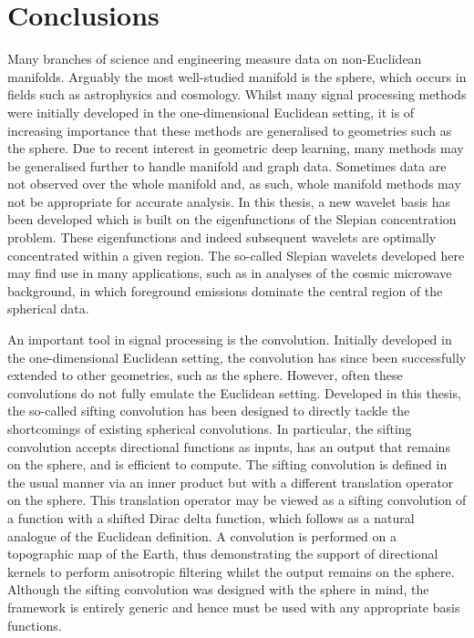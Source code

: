 \chapter{Conclusions}\label{sec:chapter6}

Many branches of science and engineering measure data on non-Euclidean manifolds.
Arguably the most well-studied manifold is the sphere, which occurs in fields such as astrophysics and cosmology.
Whilst many signal processing methods were initially developed in the one-dimensional Euclidean setting, it is of increasing importance that these methods are generalised to geometries such as the sphere.
Due to recent interest in geometric deep learning, many methods may be generalised further to handle manifold and graph data.
Sometimes data are not observed over the whole manifold and, as such, whole manifold methods may not be appropriate for accurate analysis.
In this thesis, a new wavelet basis has been developed which is built on the eigenfunctions of the Slepian concentration problem.
These eigenfunctions and indeed subsequent wavelets are optimally concentrated within a given region.
The so-called Slepian wavelets developed here may find use in many applications, such as in analyses of the cosmic microwave background, in which foreground emissions dominate the central region of the spherical data.

An important tool in signal processing is the convolution.
Initially developed in the one-dimensional Euclidean setting, the convolution has since been successfully extended to other geometries, such as the sphere.
However, often these convolutions do not fully emulate the Euclidean setting.
Developed in this thesis, the so-called sifting convolution has been designed to directly tackle the shortcomings of existing spherical convolutions.
In particular, the sifting convolution accepts directional functions as inputs, has an output that remains on the sphere, and is efficient to compute.
The sifting convolution is defined in the usual manner via an inner product but with a different translation operator on the sphere.
This translation operator may be viewed as a sifting convolution of a function with a shifted Dirac delta function, which follows as a natural analogue of the Euclidean definition.
A convolution is performed on a topographic map of the Earth, thus demonstrating the support of directional kernels to perform anisotropic filtering whilst the output remains on the sphere.
Although the sifting convolution was designed with the sphere in mind, the framework is entirely generic and hence must be used with any appropriate basis functions.
